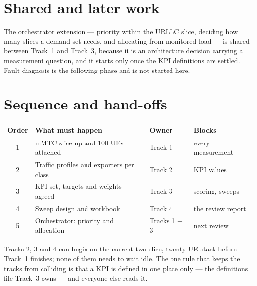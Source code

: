 \documentclass[11pt,a4paper]{article}
\begin{document}
\section*{Shared and later work}

The orchestrator extension --- priority within the URLLC slice, deciding how many slices a demand
set needs, and allocating from monitored load --- is shared between Track~1 and Track~3, because it
is an architecture decision carrying a measurement question, and it starts only once the KPI
definitions are settled. Fault diagnosis is the following phase and is not started here.

\section*{Sequence and hand-offs}

\begin{center}
\begin{tabular}{@{}clll@{}}
\toprule
\textbf{Order} & \textbf{What must happen} & \textbf{Owner} & \textbf{Blocks}\\
\midrule
1 & mMTC slice up and 100 UEs attached & Track 1 & every measurement\\
2 & Traffic profiles and exporters per class & Track 2 & KPI values\\
3 & KPI set, targets and weights agreed & Track 3 & scoring, sweeps\\
4 & Sweep design and workbook & Track 4 & the review report\\
5 & Orchestrator: priority and allocation & Tracks 1 + 3 & next review\\
\bottomrule
\end{tabular}
\end{center}

\vspace{2mm}
Tracks 2, 3 and 4 can begin on the current two-slice, twenty-UE stack before Track~1 finishes; none
of them needs to wait idle. The one rule that keeps the tracks from colliding is that a KPI is
defined in one place only --- the definitions file Track~3 owns --- and everyone else reads it.
\end{document}
